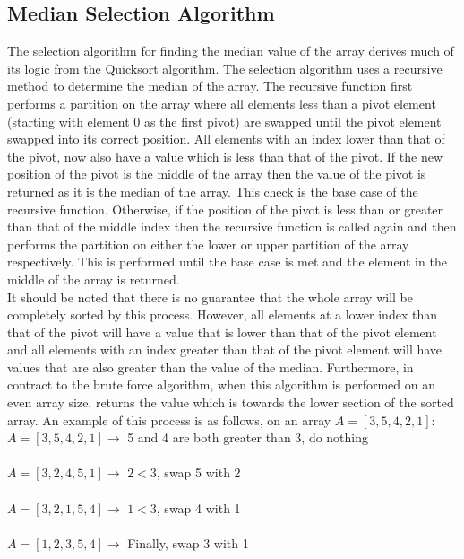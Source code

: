 \documentclass{article}
\begin{document}
    \subsection{Median Selection Algorithm}
        The selection algorithm for finding the median value of the array derives much of its logic from the Quicksort algorithm. The selection algorithm uses a recursive method to determine the median of the array.  The recursive function first performs a partition on the array where all elements less than a pivot element (starting with element 0 as the first pivot) are swapped until the pivot element swapped into its correct position. All elements with an index lower than that of the pivot, now also have a value which is less than that of the pivot. If the new position of the pivot is the middle of the array then the value of the pivot is returned as it is the median of the array. This check is the base case of the recursive function.
        Otherwise, if the position of the pivot is less than or greater than that of the middle index then the recursive function is called again and then performs the partition on either the lower or upper partition of the array respectively. This is performed until the base case is met and the element in the middle of the array is returned.\\
        It should be noted that there is no guarantee that the whole array will be completely sorted by this process. However, all elements at a lower index than that of the pivot will have a value that is lower than that of the pivot element and all elements with an index greater than that of the pivot element will have values that are also greater than the value of the median.
        Furthermore, in contract to the brute force algorithm, when this algorithm is performed on an even array size, returns the value which is towards the lower section of the sorted array.
        An example of this process is as follows, on an array $A = [3, 5, 4, 2, 1]$:\\

        \noindent$A = [3, 5, 4, 2, 1] \rightarrow$  5 and 4 are both greater than 3, do nothing\\\\
        $A = [3, 2, 4, 5, 1] \rightarrow$  $2 < 3$, swap 5 with 2\\\\
        $A = [3, 2, 1, 5, 4] \rightarrow$  $1 < 3$, swap 4 with 1\\\\
        $A = [1, 2, 3, 5, 4] \rightarrow$  Finally, swap 3 with 1\\
\end{document}
